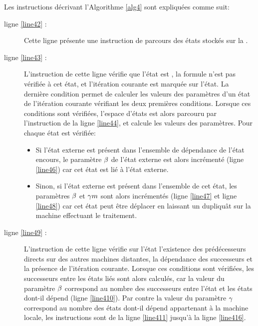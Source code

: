 Les instructions décrivant l'Algorithme \ref{alg4} sont expliquées comme suit:

\begin{description}
	\item[ligne \ref{line42} :]  Cette ligne présente une instruction de parcours des états stockés sur la \mi{}.
	\item[ligne \ref{line43} :]  L'instruction de cette ligne vérifie que l'état est , la formule n'est pas vérifiée à cet état, et l'itération courante est marquée sur l'état. La dernière condition permet de calculer les valeurs des paramètres d'un état de l'itération courante vérifiant les deux premières conditions. Lorsque ces conditions sont vérifiées, l'espace d'états est alors parcouru par l'instruction de la ligne \ref{line44}, et calcule les valeurs des paramètres. Pour chaque état est vérifiée:
	
	\begin{itemize}
	\item Si l'état externe est présent dans l'ensemble de dépendance de l'état encours, le paramètre $\beta{}$ de l'état externe est alors incrémenté (ligne \ref{line46}) car cet état est lié à l'état externe.
	\item Sinon, si l'état externe est présent dans l'ensemble  de cet état, les paramètres $\beta{}$ et $  \gamma m{}$ sont alors incrémentés (ligne \ref{line47} et ligne \ref{line48}) car cet état peut être déplacer en laissant un dupliquât sur la machine effectuant le traitement.  
	\end{itemize}
	
	\item[ligne \ref{line49} :] L'instruction de cette ligne vérifie sur l'état l'existence des prédécesseurs directs sur des autres machines distantes, la dépendance des successeurs et la présence de l'itération courante. Lorsque ces conditions sont vérifiées, les successeurs  entre les états liés sont alors calculés, car la valeur du paramètre $\beta{}$ correspond au nombre des successeurs entre l'état et les états dont-il dépend (ligne \ref{line410}). Par contre la valeur du paramètre $\gamma{}$ correspond au nombre des états dont-il dépend appartenant à la machine locale, les instructions sont de la ligne \ref{line411} jusqu'à la ligne \ref{line416}.
\end{description}

